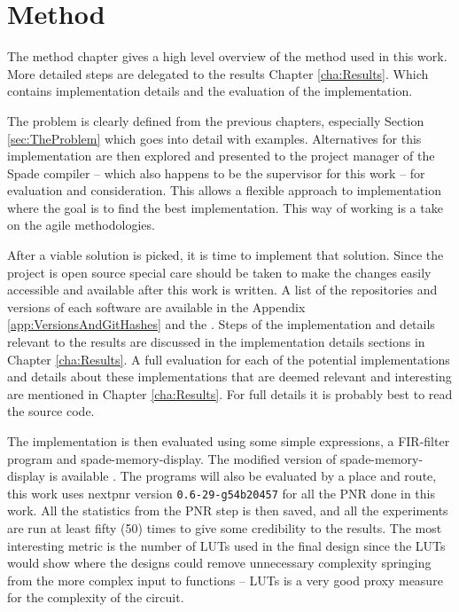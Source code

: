 \chapter{Method}
The method chapter gives a high level overview of the method used in this work. More detailed steps are delegated to the results Chapter \ref{cha:Results}. Which contains implementation details and the evaluation of the implementation.

The problem is clearly defined from the previous chapters, especially Section \ref{sec:TheProblem} which goes into detail with examples. Alternatives for this implementation are then explored and presented to the project manager of the Spade compiler -- which also happens to be the supervisor for this work -- for evaluation and consideration. This allows a flexible approach to implementation where the goal is to find the best implementation. This way of working is a take on the agile methodologies.

After a viable solution is picked, it is time to implement that solution. Since the project is open source special care should be taken to make the changes easily accessible and available after this work is written. A list of the repositories and versions of each software are available in the Appendix \ref{app:VersionsAndGitHashes} and the . Steps of the implementation and details relevant to the results are discussed in the implementation details sections in Chapter \ref{cha:Results}. A full evaluation for each of the potential implementations and details about these implementations that are deemed relevant and interesting are mentioned in Chapter \ref{cha:Results}. For full details it is probably best to read the source code. 

The implementation is then evaluated using some simple expressions, a FIR-filter  program and spade-memory-display. The modified version of spade-memory-display is available . The programs will also be evaluated by a place and route, this work uses nextpnr version \verb+0.6-29-g54b20457+ for all the PNR done in this work. All the statistics from the PNR step is then saved, and all the experiments are run at least fifty (50) times to give some credibility to the results. The most interesting metric is the number of LUTs used in the final design since the LUTs would show where the designs could remove unnecessary complexity springing from the more complex input to functions -- LUTs is a very good proxy measure for the complexity of the circuit.

